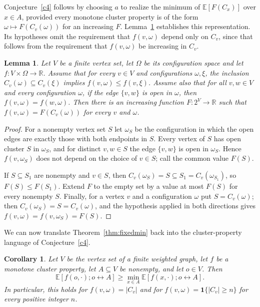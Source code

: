 \documentclass[11pt]{article}
\newtheorem{lemma}[theorem]{Lemma}
\newtheorem{corollary}[theorem]{Corollary}
\theoremstyle{definition}
\theoremstyle{remark}
\newcommand{\EE}{\mathbb E}
\newcommand{\one}{\mathbf 1}
\newcommand{\con}{\leftrightarrow}
\begin{document}
Conjecture~\ref{c4} follows by choosing $a$ to realize the minimum of $\EE[F(C_x)]$ over
$x\in A$, provided every monotone cluster property is of the form $\omega\mapsto
F(C_v(\omega))$ for an increasing $F$. Lemma~\ref{lem:clusterprop} establishes this
representation. Its hypotheses omit the
requirement that $f(v,\omega)$ depend only on $C_v$, since that follows from the
requirement that $f(v,\omega)$ be increasing in $C_v$.

\begin{lemma}\label{lem:clusterprop}
Let $V$ be a finite vertex set, let $\Omega$ be its configuration space and let
$f:V\times\Omega\to\mathbb R$. Assume that for every $v\in V$ and configurations
$\omega,\xi$, the inclusion $C_v(\omega)\subseteq C_v(\xi)$ implies
$f(v,\omega)\leq f(v,\xi)$. Assume also that for all $v,w\in V$ and every configuration
$\omega$, if the edge $\{v,w\}$ is open in $\omega$, then $f(v,\omega)=f(w,\omega)$.
Then there is an increasing function $F:2^V\to\mathbb R$ such that
$f(v,\omega)=F(C_v(\omega))$ for every $v$ and $\omega$.
\end{lemma}

\begin{proof}
For a nonempty vertex set $S$ let $\omega_S$ be the configuration in which the open edges
are exactly those with both endpoints in $S$. Every vertex of $S$ has open cluster $S$ in
$\omega_S$, and for distinct $v,w\in S$ the edge $\{v,w\}$ is open in $\omega_S$. Hence
$f(v,\omega_S)$ does not depend on the choice of $v\in S$; call the common value $F(S)$.

If $S\subseteq S_1$ are nonempty and $v\in S$, then $C_v(\omega_S)=S\subseteq
S_1=C_v(\omega_{S_1})$, so $F(S)\leq F(S_1)$. Extend $F$ to the empty set by a value at most
$F(S)$ for every nonempty $S$. Finally, for a vertex $v$ and a configuration $\omega$ put
$S=C_v(\omega)$; then $C_v(\omega_S)=S=C_v(\omega)$, and the hypothesis applied in both
directions gives $f(v,\omega)=f(v,\omega_S)=F(S)$.
\end{proof}

We can now translate Theorem~\ref{thm:fixedmin} back into the cluster-property language
of Conjecture~\ref{c4}.

\begin{corollary}\label{cor:c4}
Let $V$ be the vertex set of a finite weighted graph, let $f$ be a monotone cluster
property, let $A\subseteq V$ be nonempty, and let $o\in V$. Then
\[
 \EE[f(o,\cdot);o\con A]\geq
 \min_{x\in A}\EE[f(x,\cdot);o\con A].
\]
In particular, this holds for $f(v,\omega)=|C_v|$ and for
$f(v,\omega)=\one\{|C_v|\geq n\}$ for every positive integer $n$.
\end{corollary}
\end{document}
